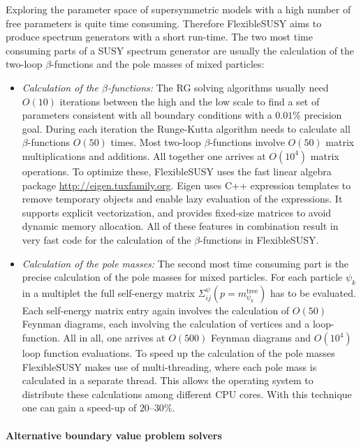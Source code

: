 \documentclass[final,3p,11pt,pdflatex]{elsarticle}
\makeatletter
\newcommand{\fs}{FlexibleSUSY\@\xspace}
\makeatother
\begin{document}
Exploring the parameter space of supersymmetric models with a high
number of free parameters is quite time consuming.  Therefore \fs aims
to produce spectrum generators with a short run-time.  The two most
time consuming parts of a SUSY spectrum generator are usually the
calculation of the two-loop $\beta$-functions and the pole masses of
mixed particles:
%
\begin{itemize}
\item \emph{Calculation of the $\beta$-functions:} The RG solving
  algorithms usually need $O(10)$ iterations between the high and the
  low scale to find a set of parameters consistent with all boundary
  conditions with a $0.01\%$ precision goal.  During each iteration
  the Runge-Kutta algorithm needs to calculate all $\beta$-functions
  $O(50)$ times.  Most two-loop $\beta$-functions involve $O(50)$
  matrix multiplications and additions.  All together one arrives at
  $O(10^4)$ matrix operations.  To optimize these, \fs uses the fast
  linear algebra package \href{Eigen}{http://eigen.tuxfamily.org}.
  Eigen uses C++ expression templates to remove temporary objects and
  enable lazy evaluation of the expressions.  It supports explicit
  vectorization, and provides fixed-size matrices to avoid dynamic
  memory allocation.  All of these features in combination result in
  very fast code for the calculation of the $\beta$-functions in \fs.
%
\item \emph{Calculation of the pole masses:} The second most time
  consuming part is the precise calculation of the pole masses for
  mixed particles.  For each particle $\psi_k$ in a multiplet the full
  self-energy matrix $\Sigma^\psi_{ij}(p=m^\text{tree}_{\psi_k})$ has
  to be evaluated.  Each self-energy matrix entry again involves the
  calculation of $O(50)$ Feynman diagrams, each involving the
  calculation of vertices and a loop-function.  All in all, one
  arrives at $O(500)$ Feynman diagrams and $O(10^4)$ loop function
  evaluations.  To speed up the calculation of the pole masses \fs
  makes use of multi-threading, where each pole mass is calculated in
  a separate thread.  This allows the operating system to distribute
  these calculations among different CPU cores.  With this technique
  one can gain a speed-up of $20$--$30\%$.
\end{itemize}

\paragraph{Alternative boundary value problem solvers}
\end{document}
